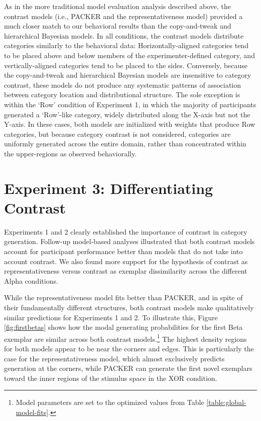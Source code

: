 \documentclass[12pt]{article}
\begin{document}
\begin{flushleft}
As in the more traditional model evaluation analysis described above, the
contrast models (i.e., PACKER and the representativeness model) provided a much
closer match to our behavioral results than the copy-and-tweak and hierarchical
Bayesian models. In all conditions, the contrast models distribute categories
similarly to the behavioral data: Horizontally-aligned categories tend to be
placed above and below members of the experimenter-defined category, and
vertically-aligned categories tend to be placed to the sides. Conversely,
because the copy-and-tweak and hierarchical Bayesian models are insensitive to
category contrast, these models do not produce any systematic patterns of
association between category location and distributional structure. The sole
exception is within the `Row' condition of Experiment 1, in which the majority
of participants generated a `Row'-like category, widely distributed along the
X-axis but not the Y-axis. In these cases, both models are initialized with
weights that produce Row categories, but because category contrast is not
considered, categories are uniformly generated across the entire domain, rather
than concentrated within the upper-regions as observed behaviorally.

\section{Experiment 3: Differentiating Contrast}
\label{section:diffcon}
Experiments 1 and 2 clearly established the importance of contrast in category
generation. Follow-up model-based analyses illustrated that both contrast models account for participant performance better than models that do not take into
account contrast. We also found more support for the hypothesis of contrast as
representativeness versus contrast as exemplar dissimilarity across the
different Alpha conditions.

While the representativeness model fits better than PACKER, and in spite of
their fundamentally different structures, both contrast models make qualitatively similar predictions for Experiments 1 and 2. To illustrate this, Figure \ref{fig:firstbetas} shows how the modal generating probabilities for the first Beta exemplar are similar across both contrast models.\footnote{Model parameters are set to the optimized values from Table \ref{table:global-model-fits}.} The highest density regions for both models appear to be near the corners and edges. This is particularly the case for the representativeness model, which almost exclusively predicts generation at the corners, while PACKER can generate the first novel exemplars toward the inner regions of the stimulus space in the XOR condition.


\end{flushleft}
\end{document}

